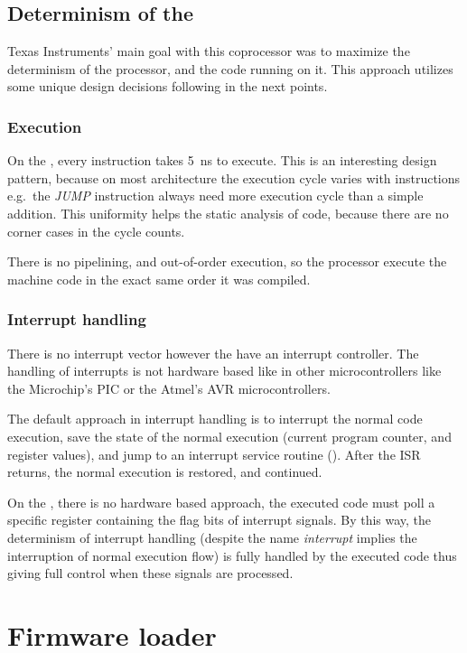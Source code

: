 \subsection{Determinism of the \pru}

Texas Instruments' main goal with this coprocessor was to maximize the determinism of the processor, and the code running on it. This approach utilizes some unique design decisions following in the next points.

\subsubsection{Execution}

On the \pru, every instruction takes \SI{5}{\nano\second} to execute. This is an interesting design pattern, because on most architecture the execution cycle varies with instructions e.g.\ the \emph{JUMP} instruction always need more execution cycle than a simple addition. This uniformity helps the static analysis of code, because there are no corner cases in the cycle counts.

There is no pipelining, and out-of-order execution, so the processor execute the machine code in the exact same order it was compiled.

\subsubsection{Interrupt handling}

There is no interrupt vector however the \pruss{} have an interrupt controller. The handling of interrupts is not hardware based like in other microcontrollers like the Microchip's PIC or the Atmel's AVR microcontrollers.

The default approach in interrupt handling is to interrupt the normal code execution, save the state of the normal execution (current program counter, and register values), and jump to an interrupt service routine (). After the ISR returns, the normal execution is restored, and continued.

On the \pru{}, there is no hardware based approach, the executed code must poll a specific register containing the flag bits of interrupt signals. By this way, the determinism of interrupt handling (despite the name \emph{interrupt} implies the interruption of normal execution flow) is fully handled by the executed code thus giving full control when these signals are processed.

\section{Firmware loader}


